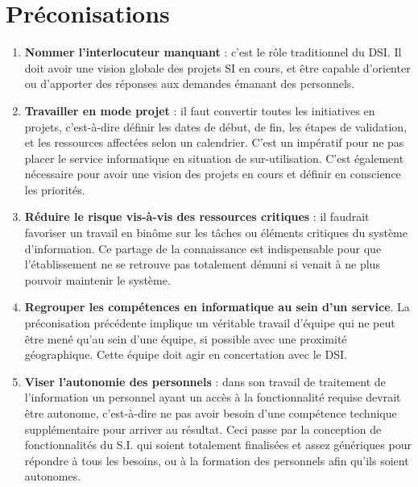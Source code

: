 \documentclass{book}
\begin{document}
\section{Préconisations}

\begin{enumerate}
\item	\textbf{Nommer l'interlocuteur manquant} : c'est le rôle traditionnel du DSI. Il doit
avoir une vision globale des projets SI en cours, et être capable d'orienter ou 
d'apporter des réponses aux demandes émanant des personnels.\\

\item \textbf{Travailler en mode projet} : il faut convertir toutes les initiatives en projets,
c'est-à-dire définir les dates de début, de fin, les étapes de validation, et les ressources
affectées selon un calendrier. C'est un impératif pour ne pas placer le service informatique
en situation de sur-utilisation. C'est également nécessaire pour avoir une vision des projets
en cours et définir en conscience les priorités.\\

\item \textbf{Réduire le risque vis-à-vis des ressources critiques} : il faudrait favoriser
un travail en binôme sur les tâches ou éléments critiques du système d'information. Ce 
partage de la connaissance est indispensable pour que l'établissement ne se retrouve pas
totalement démuni si \CK venait à ne plus pouvoir maintenir le système.\\

\item \textbf{Regrouper les compétences en informatique au sein d'un service}. 
La préconisation précédente implique un véritable travail d'équipe qui ne peut être mené
qu'au sein d'une équipe, si possible avec une proximité géographique. Cette équipe
doit agir en concertation avec le DSI.\\

\item \textbf{Viser l'autonomie des personnels} : dans son travail de traitement de
l'information un personnel ayant un accès à la fonctionnalité requise devrait être 
autonome, c'est-à-dire ne pas avoir besoin d'une compétence technique supplémentaire 
pour arriver au résultat. Ceci passe par la conception de fonctionnalités du S.I. qui
soient totalement finalisées et assez génériques pour répondre à tous les besoins,
ou à la formation des personnels afin qu'ils soient autonomes.




\end{enumerate}
\end{document}
